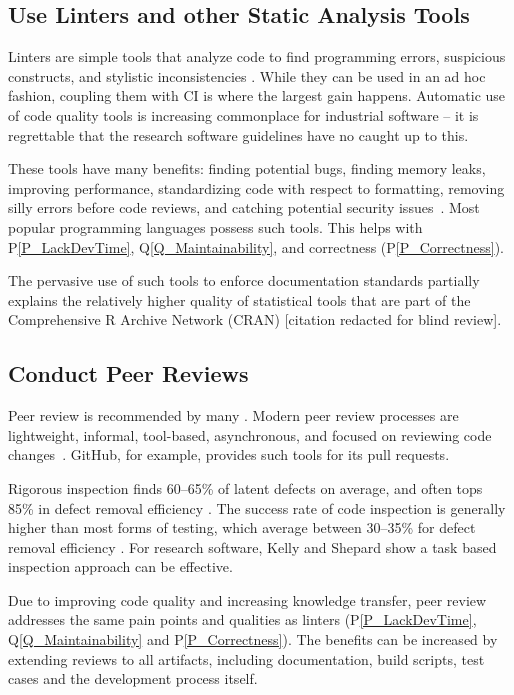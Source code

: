 \documentclass[doubleblind,12pt, 3p, times]{elsarticle}
\newcommand{\ppref}[1]{P\ref{#1}}
\newcommand{\qref}[1]{Q\ref{#1}}
\begin{document}
\subsection{Use Linters and other Static Analysis Tools} \label{Sec_Linters}

Linters are simple tools that analyze code to find programming errors,
suspicious constructs, and stylistic inconsistencies \cite{Wikipedia2022_Lint}.
While they can be used in an ad hoc fashion, coupling them with CI is where
the largest gain happens. Automatic use of code quality tools is increasing
commonplace for industrial software -- it is regrettable that the
research software guidelines have no caught up to this.

These tools have many benefits: finding potential bugs, finding memory
leaks, improving performance, standardizing code with respect to formatting,
removing silly errors before code reviews, and catching potential security
issues~\cite{SourceLevel2022_Lint}. Most popular programming languages possess
such tools. This helps with \ppref{P_LackDevTime}, \qref{Q_Maintainability},
and correctness (\ppref{P_Correctness}).

The pervasive use of such tools to enforce documentation standards
partially explains the relatively higher quality of statistical tools that are
part of the Comprehensive R Archive Network (CRAN) [citation redacted for blind
review].  %

\subsection{Conduct Peer Reviews} \label{Sec_PeerReview}

Peer review is recommended by many \cite{HerouxEtAl2008,
OrvizEtAl2017, USGS2019}. Modern peer review processes are lightweight,
informal, tool-based, asynchronous, and focused
on reviewing code changes~\cite{SadowskiEtAl2018}. GitHub, for example,
provides such tools for its pull requests.

Rigorous inspection finds 60--65\% of latent defects on
average, and often tops 85\% in defect removal efficiency \cite{Jones2008}. The
success rate of code inspection is generally higher than most forms of testing,
which average between 30--35\% for defect removal efficiency
\cite{EbertAndJones2009, Jones2008}. For research software, Kelly and Shepard
\cite{KellyAndShepard2000} show a task based inspection approach can be
effective.

Due to improving code quality and increasing knowledge transfer, peer review
addresses the same pain points and qualities as linters (\ppref{P_LackDevTime},
\qref{Q_Maintainability} and \ppref{P_Correctness}). The benefits can be
increased by extending reviews to all artifacts, including documentation, build
scripts, test cases and the development process itself.
\end{document}
